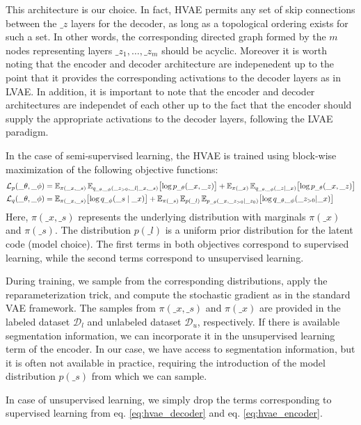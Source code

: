 This architecture is our choice. In fact, HVAE permits any set of skip connections between the $\_z$ layers for the decoder, as long as a topological ordering exists 
for such a set. In other words, the corresponding directed graph formed by the $m$ nodes representing layers $\_z_1,\dots,\_z_m$ should be acyclic. 
Moreover it is worth noting that the encoder and decoder architecture are indepenedent up to the point that it provides the corresponding activations to the decoder layers
as in LVAE. In addition, it is important to note that the encoder and decoder architectures are independet of each other up to the fact that the encoder 
should supply the appropriate activations to the decoder layers, following the LVAE paradigm. 

In the case of semi-supervised learning, the HVAE is trained using block-wise maximization of the following objective functions:
\begin{align}
    \mathcal{L}_{p}(\_\theta,\_\phi) &= 
        \operatorname{\mathbb{E}}_{\pi(\_x,\_s)}\operatorname{\mathbb{E}}_{q_{\_\theta,\_\phi}(\_z_{>0},\_l \mid \_x, \_s)}\bigl[\log p_{\_\theta}(\_x,\_z)\bigr]+
        \operatorname{\mathbb{E}}_{\pi(\_x)}\operatorname{\mathbb{E}}_{q_{\_\theta,\_\phi}(\_z \mid \_x)} \bigl[\log p_{\_\theta}(\_x,\_z)\bigr] \label{eq:hvae_decoder}\\
    \mathcal{L}_{q}(\_\theta,\_\phi) &=
        \operatorname{\mathbb{E}}_{\pi(\_x,\_s)}\bigl[\log q_{\_\phi}(\_s \mid \_x) \bigr] + 
        \operatorname{\mathbb{E}}_{\pi(\_s)}\operatorname{\mathbb{E}}_{p(\_l)}\operatorname{\mathbb{E}}_{p_{\_\theta}(\_x,\_z_{>0} \mid \_z_{0})} \bigl[\log q_{\_\theta,\_\phi}(\_z_{>0} | \_x)\bigr] \label{eq:hvae_encoder}
\end{align}
Here, $\pi(\_x,\_s)$ represents the underlying distribution with marginals $\pi(\_x)$ and $\pi(\_s)$. 
The distribution $p(\_l)$ is a uniform prior distribution for the latent code (model choice).
The first terms in both objectives correspond to supervised learning, while the second terms correspond to unsupervised learning.

During training, we sample from the corresponding distributions, apply the reparameterization trick, and compute the stochastic 
gradient as in the standard VAE framework. The samples from $\pi(\_x,\_s)$ and $\pi(\_x)$ are provided in the labeled dataset $\mathcal{D}_l$ 
and unlabeled dataset $\mathcal{D}_u$, respectively. If there is available segmentation information, we can incorporate it in 
the unsupervised learning term of the encoder. In our case, we have access to segmentation information, but it is often not 
available in practice, requiring the introduction of the model distribution $p(\_s)$ from which we can sample.

In case of unsupervised learning, we simply drop the terms corresponding to supervised learning from eq. \ref{eq:hvae_decoder} 
and eq. \ref{eq:hvae_encoder}.



